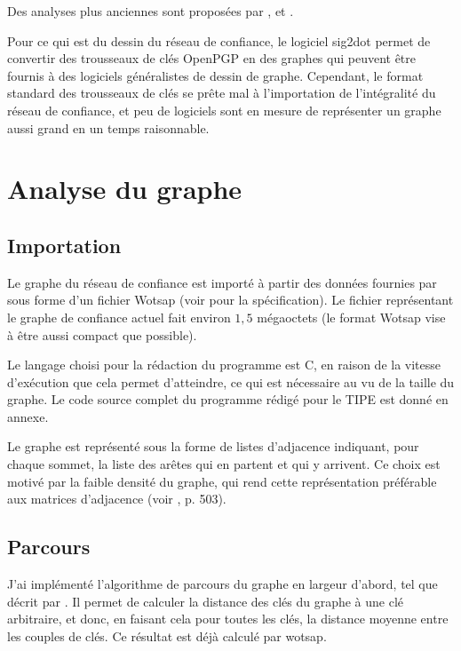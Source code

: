 \documentclass[a4paper]{article}
\begin{document}
Des analyses plus anciennes sont proposées par \cite{W3}, \cite{W4} et \cite{W5}.

Pour ce qui est du dessin du réseau de confiance, le logiciel sig2dot \cite{W6} permet de convertir des trousseaux de clés OpenPGP en des graphes qui peuvent être fournis à des logiciels généralistes de dessin de graphe. Cependant, le format standard des trousseaux de clés se prête mal à l'importation de l'intégralité du réseau de confiance, et peu de logiciels sont en mesure de représenter un graphe aussi grand en un temps raisonnable.

\section{Analyse du graphe}

\subsection{Importation}

Le graphe du réseau de confiance est importé à partir des données fournies par \cite{W1} sous forme d'un fichier Wotsap (voir \cite{W1b} pour la spécification). Le fichier représentant le graphe de confiance actuel fait environ $1,5$ mégaoctets (le format Wotsap vise à être aussi compact que possible).

Le langage choisi pour la rédaction du programme est C, en raison de la vitesse d'exécution que cela permet d'atteindre, ce qui est nécessaire au vu de la taille du graphe. Le code source complet du programme rédigé pour le TIPE est donné en annexe.

Le graphe est représenté sous la forme de listes d'adjacence indiquant, pour chaque sommet, la liste des arêtes qui en partent et qui y arrivent. Ce choix est motivé par la faible densité du graphe, qui rend cette représentation préférable aux matrices d'adjacence (voir \cite{CFI}, p. 503).

\subsection{Parcours}

J'ai implémenté l'algorithme de parcours du graphe en largeur d'abord, tel que décrit par \cite{IA}. Il permet de calculer la distance des clés du graphe à une clé arbitraire, et donc, en faisant cela pour toutes les clés, la distance moyenne entre les couples de clés. Ce résultat est déjà calculé par wotsap.
\end{document}
